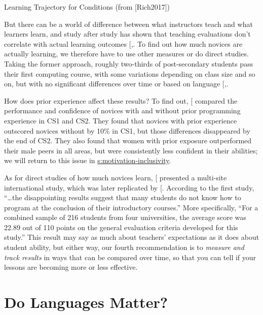 Learning Trajectory for Conditions (from {[}Rich2017{]})

But there can be a world of difference between what instructors teach
and what learners learn, and study after study has shown that teaching
evaluations don't correlate with actual learning outcomes
{[},\protect[\hyperlink{b:Uttl2017}{Uttl2017}]{]}. To find out how much novices are actually
learning, we therefore have to use other measures or do direct studies.
Taking the former approach, roughly two-thirds of post-secondary
students pass their first computing course, with some variations
depending on class size and so on, but with no significant differences
over time or based on language {[},\protect[\hyperlink{b:Wats2014}{Wats2014}]{]}.

How does prior experience affect these results? To find out,
{[}\protect[\hyperlink{b:Wilc2018}{Wilc2018}]{]} compared the performance and confidence of novices
with and without prior programming experience in CS1 and CS2. They found
that novices with prior experience outscored novices without by 10\% in
CS1, but those differences disappeared by the end of CS2. They also
found that women with prior exposure outperformed their male peers in
all areas, but were consistently less confident in their abilities; we
will return to this issue in \protect\hyperlink{SECTION}{s:motivation-inclusivity}.

As for direct studies of how much novices learn, {[}\protect[\hyperlink{b:McCr2001}{McCr2001}]{]}
presented a multi-site international study, which was later replicated
by {[}\protect[\hyperlink{b:Utti2013}{Utti2013}]{]}. According to the first study, ``\ldots{}the
disappointing results suggest that many students do not know how to
program at the conclusion of their introductory courses.'' More
specifically, ``For a combined sample of 216 students from four
universities, the average score was 22.89 out of 110 points on the
general evaluation criteria developed for this study.'' This result may
say as much about teachers' expectations as it does about student
ability, but either way, our fourth recommendation is to \emph{measure and
track results} in ways that can be compared over time, so that you can
tell if your lessons are becoming more or less effective.

\section{Do Languages Matter?}\label{s:pck-language}

